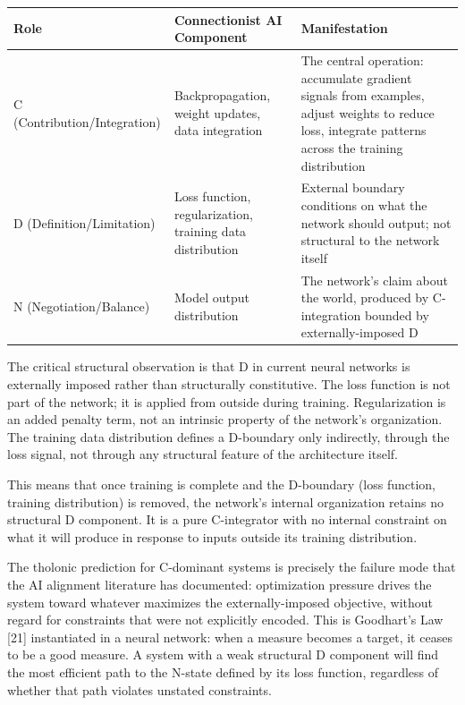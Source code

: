 \documentclass[
  11pt,
  letterpaper,
]{article}
\begin{document}
\begin{longtable}[]{@{}
  >{\raggedright\arraybackslash}p{}
  >{\raggedright\arraybackslash}p{}
  >{\raggedright\arraybackslash}p{}@{}}
\toprule\noalign{}
\begin{minipage}[b]{\linewidth}\raggedright
Role
\end{minipage} & \begin{minipage}[b]{\linewidth}\raggedright
Connectionist AI Component
\end{minipage} & \begin{minipage}[b]{\linewidth}\raggedright
Manifestation
\end{minipage} \\
\midrule\noalign{}
\endhead
\bottomrule\noalign{}
\endlastfoot
C (Contribution/Integration) & Backpropagation, weight updates, data
integration & The central operation: accumulate gradient signals from
examples, adjust weights to reduce loss, integrate patterns across the
training distribution \\
D (Definition/Limitation) & Loss function, regularization, training data
distribution & External boundary conditions on what the network should
output; not structural to the network itself \\
N (Negotiation/Balance) & Model output distribution & The network's
claim about the world, produced by C-integration bounded by
externally-imposed D \\
\end{longtable}

The critical structural observation is that D in current neural networks
is externally imposed rather than structurally constitutive. The loss
function is not part of the network; it is applied from outside during
training. Regularization is an added penalty term, not an intrinsic
property of the network's organization. The training data distribution
defines a D-boundary only indirectly, through the loss signal, not
through any structural feature of the architecture itself.

This means that once training is complete and the D-boundary (loss
function, training distribution) is removed, the network's internal
organization retains no structural D component. It is a pure
C-integrator with no internal constraint on what it will produce in
response to inputs outside its training distribution.

The tholonic prediction for C-dominant systems is precisely the failure
mode that the AI alignment literature has documented: optimization
pressure drives the system toward whatever maximizes the
externally-imposed objective, without regard for constraints that were
not explicitly encoded. This is Goodhart's Law {[}21{]} instantiated in
a neural network: when a measure becomes a target, it ceases to be a
good measure. A system with a weak structural D component will find the
most efficient path to the N-state defined by its loss function,
regardless of whether that path violates unstated constraints.
\end{document}
